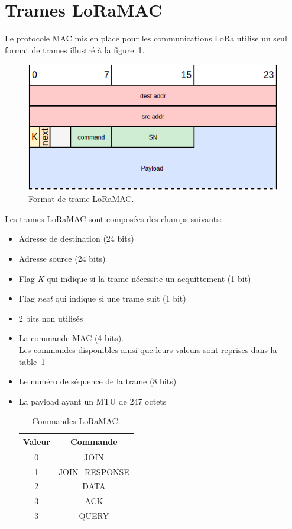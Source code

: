 \section{Trames LoRaMAC}\label{sec:archi-loramac-frame}
\renewcommand{\rightmark}{Trames LoRaMac}

    Le protocole MAC mis en place pour les communications LoRa utilise un seul format de trames illustré à la figure~\ref{fig:archi-frame}.
    \begin{figure}[H]
        \centering
        \includegraphics[scale=0.5]{res/pictures/loramac-frame.drawio.png}
        \caption{Format de trame LoRaMAC.}
        \label{fig:archi-frame}
    \end{figure}
    Les trames LoRaMAC sont composées des champs suivants:
    \begin{itemize}
        \item Adresse de destination (24 bits)
        \item Adresse source (24 bits)
        \item Flag \textit{K} qui indique si la trame nécessite un acquittement (1 bit)
        \item Flag \textit{next} qui indique si une trame suit (1 bit)
        \item 2 bits non utilisés
        \item La commande MAC (4 bits).\\
        Les commandes disponibles ainsi que leurs valeurs sont reprises dans la table~\ref{tb:archi-loramac-command}
        \item Le numéro de séquence de la trame (8 bits)
        \item La payload ayant un MTU de 247 octets
        \begin{table}[H]
            \centering
            \begin{tabular}{|c|c|}
                \hline
                Valeur & Commande\\ \hline
                0 & JOIN\\ \hline
                1 & JOIN\_RESPONSE\\ \hline
                2 & DATA\\ \hline
                3 & ACK\\ \hline
                3 & QUERY\\ \hline
            \end{tabular}
            \caption{Commandes LoRaMAC.}
            \label{tb:archi-loramac-command}
        \end{table}
    \end{itemize}

